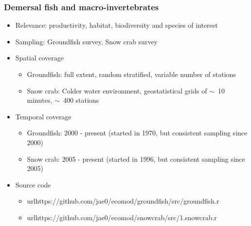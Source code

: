 \documentclass{beamer}
\numberwithin{equation}{section}		%
\numberwithin{figure}{section}		%
\numberwithin{table}{section}				%
\begin{document}
\begin{frame}
\frametitle{Demersal fish and macro-invertebrates}
\begin{itemize}
  \item Relevance:  productivity, habitat, biodiversity and species of interest
  \item Sampling:  Groundfish survey, Snow crab survey 
  \item Spatial coverage
  \begin{itemize}
    \item Groundfish: full extent, random stratified, variable number of stations
    \item Snow crab: Colder water environment, geostatistical grids of $\sim$~10 minutes, $\sim$~400 stations 
  \end{itemize}
  \item Temporal coverage
  \begin{itemize}
    \item Groundfish: 2000 - present (started in 1970, but consistent sampling since 2000)
    \item Snow crab: 2005 - present (started in 1996, but consistent sampling since 2005)
  \end{itemize}
  
  \item Source code
  \begin{itemize}
    \item url{https://github.com/jae0/ecomod/groundfish/src/groundfish.r}
    \item url{https://github.com/jae0/ecomod/snowcrab/src/1.snowcrab.r}
  \end{itemize}
\end{itemize}
\end{frame}






\end{document}
